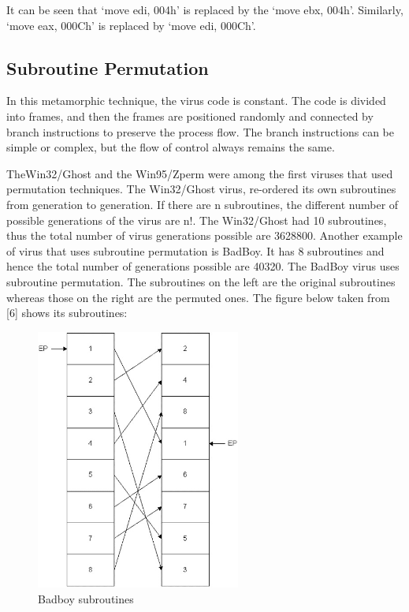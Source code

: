 It can be seen that \lq move edi, 004h\rq\: is replaced by the \lq move ebx, 004h\rq. Similarly, \lq move eax, 000Ch\rq\: is replaced by \lq move edi, 000Ch\rq.

\subsection{Subroutine Permutation}
In this metamorphic technique, the virus code is constant. The code is divided into frames, and then the frames are positioned randomly and connected by branch instructions to preserve the process flow. The branch instructions can be simple or complex, but the flow of control always remains the same.

TheWin32/Ghost and the Win95/Zperm were among the first viruses that used permutation techniques. The Win32/Ghost virus, re-ordered its own subroutines from generation to generation. If there are n subroutines, the different number of possible generations of the virus are n!. The Win32/Ghost had 10 subroutines, thus the total number of virus generations possible are 3628800. Another example of virus that uses subroutine permutation is BadBoy. It has 8 subroutines and hence the total number of generations possible are 40320. The BadBoy virus uses subroutine permutation. The subroutines on the left are the original subroutines whereas those on the right are the permuted ones. The figure below taken from [6] shows its subroutines:

\begin{figure}[htb]
\centering
\includegraphics[width=0.6\textwidth]{images/badboy.jpg}
\caption{Badboy subroutines} 
\label{fig: Badboy subrotines}
\end{figure}

